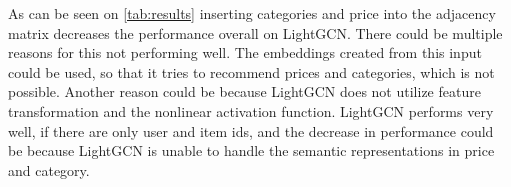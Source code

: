 As can be seen on \autoref{tab:results} inserting categories and price into the adjacency matrix decreases the performance overall on LightGCN.
There could be multiple reasons for this not performing well.
The embeddings created from this input could be used, so that it tries to recommend prices and categories, which is not possible.
Another reason could be because LightGCN does not utilize feature transformation and the nonlinear activation function.
LightGCN performs very well, if there are only user and item ids, and the decrease in performance could be because LightGCN is unable to handle the semantic representations in price and category.